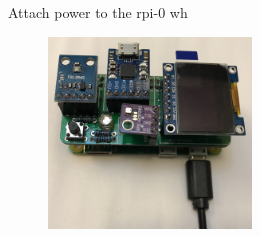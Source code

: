 \begin{frame}
   {Attach power to the rpi-0 wh}
   \begin{figure}[H]
      \centering
      \includegraphics[height=2in]{IMAGES/rpi0whsd-bonnet-power}
   \end{figure}
\end{frame}

\cprotect\note{


}

